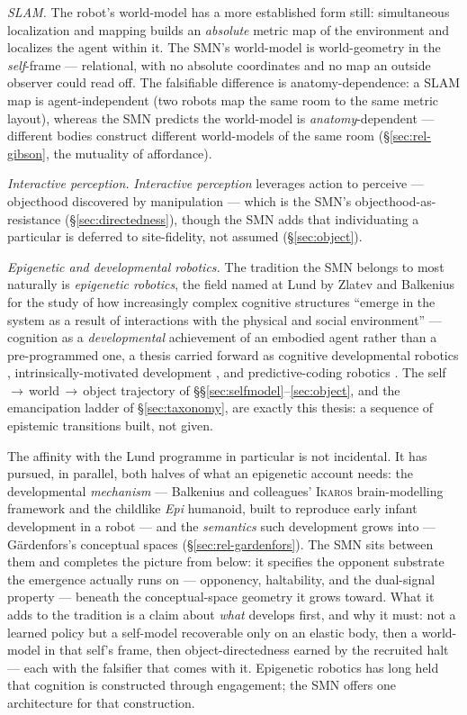 \documentclass{article}
\begin{document}
\emph{SLAM.}  The robot's world-model has a more established form still:
simultaneous localization and mapping \citep{DurrantWhyteBailey2006SLAM}
builds an \emph{absolute} metric map of the environment and localizes the
agent within it.  The SMN's world-model is world-geometry in the
\emph{self}-frame --- relational, with no absolute coordinates and no map
an outside observer could read off.  The falsifiable difference is
anatomy-dependence: a SLAM map is agent-independent (two robots map the
same room to the same metric layout), whereas the SMN predicts the
world-model is \emph{anatomy}-dependent --- different bodies construct
different world-models of the same room (\S\ref{sec:rel-gibson}, the
mutuality of affordance).

\emph{Interactive perception.}  \emph{Interactive perception}
\citep{Bohg2017InteractivePerception} leverages action to perceive ---
objecthood discovered by manipulation --- which is the SMN's
objecthood-as-resistance (\S\ref{sec:directedness}), though the SMN adds
that individuating a particular is deferred to site-fidelity, not assumed
(\S\ref{sec:object}).

\emph{Epigenetic and developmental robotics.}  The tradition the SMN
belongs to most naturally is \emph{epigenetic robotics}, the field named
at Lund by Zlatev and Balkenius for the study of how increasingly complex
cognitive structures ``emerge in the system as a result of interactions
with the physical and social environment''
\citep{Balkenius2001EpigeneticRobotics} --- cognition as a
\emph{developmental} achievement of an embodied agent rather than a
pre-programmed one, a thesis carried forward as cognitive developmental
robotics \citep{Asada2009DevelopmentalRobotics}, intrinsically-motivated
development \citep{Oudeyer2007IntrinsicMotivation}, and predictive-coding
robotics \citep{tani2016exploring}.  The self\,$\to$\,world\,$\to$\,object
trajectory of \S\S\ref{sec:selfmodel}--\ref{sec:object}, and the
emancipation ladder of \S\ref{sec:taxonomy}, are exactly this thesis: a
sequence of epistemic transitions built, not given.

The affinity with the Lund programme in particular is not incidental.  It
has pursued, in parallel, both halves of what an epigenetic account needs:
the developmental \emph{mechanism} --- Balkenius and colleagues' \textsc{Ikaros}
brain-modelling framework and the childlike \emph{Epi} humanoid, built to
reproduce early infant development in a robot \citep{Balkenius2010Ikaros}
--- and the \emph{semantics} such development grows into --- G\"ardenfors's
conceptual spaces (\S\ref{sec:rel-gardenfors}).  The SMN sits between them
and completes the picture from below: it specifies the opponent substrate
the emergence actually runs on --- opponency, haltability, and the
dual-signal property --- beneath the conceptual-space geometry it grows
toward.  What it adds to the tradition is a claim about \emph{what}
develops first, and why it must: not a learned policy but a self-model
recoverable only on an elastic body, then a world-model in that self's
frame, then object-directedness earned by the recruited halt --- each with
the falsifier that comes with it.  Epigenetic robotics has long held that
cognition is constructed through engagement; the SMN offers one
architecture for that construction.
\end{document}
